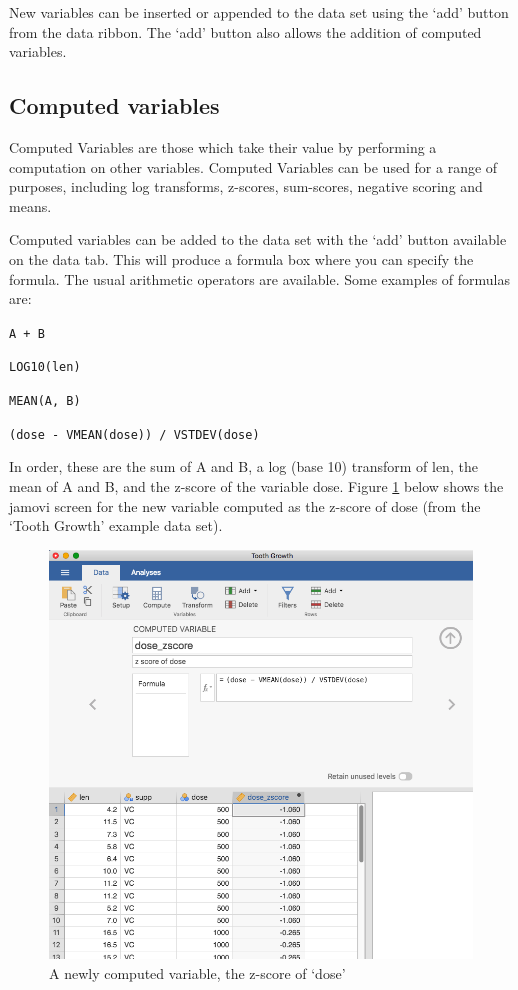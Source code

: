 \documentclass[
]{book}
\begin{document}
New variables can be inserted or appended to the data set using the `add' button from the data ribbon. The `add' button also allows the addition of computed variables.

\hypertarget{computed-variables}{%
\subsection{Computed variables}\label{computed-variables}}

Computed Variables are those which take their value by performing a computation on other variables. Computed Variables can be used for a range of purposes, including log transforms, z-scores, sum-scores, negative scoring and means.

Computed variables can be added to the data set with the `add' button available on the data tab. This will produce a formula box where you can specify the formula. The usual arithmetic operators are available. Some examples of formulas are:

\texttt{A\ +\ B}

\texttt{LOG10(len)}

\texttt{MEAN(A,\ B)}

\texttt{(dose\ -\ VMEAN(dose))\ /\ VSTDEV(dose)}

In order, these are the sum of A and B, a log (base 10) transform of len, the mean of A and B, and the z-score of the variable dose. Figure \ref{fig:computedvariable} below shows the jamovi screen for the new variable computed as the z-score of dose (from the `Tooth Growth' example data set).

\begin{figure}

{\centering \includegraphics[width=1\linewidth]{img/introj/computedvariable} 

}

\caption{A newly computed variable, the z-score of ‘dose’}\label{fig:computedvariable}
\end{figure}
\end{document}
